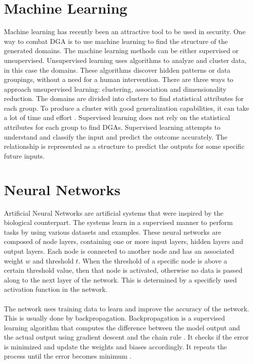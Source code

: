 \section{Machine Learning}
Machine learning has recently been an attractive tool to be used in security. One way to combat DGA is to use machine learning to find the structure of the generated domains. The machine learning methods can be either supervised or unsupervised. Unsupervised learning uses algorithms to analyze and cluster data, in this case the domains. These algorithms discover hidden patterns or data groupings, without a need for a human intervention. There are three ways to approach unsupervised learning: clustering, association and dimensionality reduction. The domains are divided into clusters to find statistical attributes for each group. To produce a cluster with good generalization capabilities, it can take a lot of time and  effort \cite{Unsupervised}. Supervised learning does not rely on the statistical attributes  for each group to find DGAs. Supervised learning attempts to understand and classify the input and predict the outcome accurately. The relationship is represented as a structure to predict the outputs for some specific future inputs.

\section{Neural Networks}
Artificial Neural Networks are artificial systems that were inspired by the biological counterpart. The systems learn in a supervised manner to perform tasks by using various datasets and examples. These neural networks are composed of node layers, containing one or more input layers, hidden layers and output layers. Each node is connected to another node and has an associated weight $w$ and threshold $t$. When the threshold of a specific node is above a certain threshold value, then that node is activated, otherwise no data is passed along to the next layer of the network. This is determined by a specificly used activation function in the network. \\\\ 
The network uses training data to learn and improve the accuracy of the network. This is usually done by backpropagation. Backpropagation is a supervised learning algorithm that computes the difference between the model output and the actual output using gradient descent and the chain rule . It checks if the error is minimized and update the weights and biases accordingly. It repeats the process until the error becomes minimum \cite{Gradient_Descent}.


